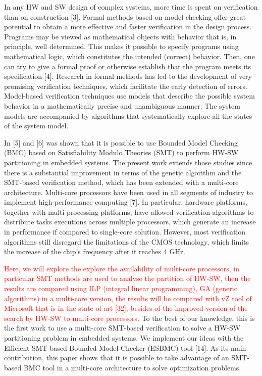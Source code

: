 In any HW and SW design of complex systems, more time is spent on verification than on construction [3]. Formal methods based on model checking offer great potential to obtain a more effective and faster verification in the design process. Programs may be viewed as mathematical objects with behavior that is, in principle, well determined. This makes it possible to specify programs using mathematical logic, which constitutes the intended (correct) behavior. Then, one can try to give a formal proof or otherwise establish that the program meets its specification [4]. Research in formal methods has led to the development of very promising verification techniques, which facilitate the early detection of errors. Model-based verification techniques use models that describe the possible system behavior in a mathematically precise and unambiguous manner. The system models are accompanied by algorithms that systematically explore all the states of the system model.

In [5] and [6] was shown that it is possible to use Bounded Model Checking (BMC) based on Satisfiability Modulo Theories (SMT) to perform HW-SW partitioning in embedded systems. The present work extends those studies since there is a substantial improvement in terms of the genetic algorithm and the SMT-based verification method, which has been extended with a multi-core architecture. Multi-core processors have been used in all segments of industry to implement high-performance computing [7]. In particular, hardware platforms, together with multi-processing platforms, have allowed verification algorithms to distribute tasks executions across multiple processors, which generate an increase in performance if compared to single-core solution. However, most verification algorithms still disregard the limitations of the CMOS technology, which limits the increase of the chip’s frequency after it reaches 4 GHz.

\textcolor{Red}{Here, we will explore the explore the availability of multi-core processors, in particular SMT methods are used to analyse the partition of HW-SW, then the results are compared using ILP (integral linear programming), GA (generic algorithms) in a multi-core version, the results will be compared with vZ tool of Microsoft that is in the state of art [32], besides of the improved version of the search by HW-SW to multi-core processors.} To the best of our knowledge, this is the first work to use a multi-core SMT-based verification to solve a HW-SW partitioning problem in embedded systems. We implement our ideas with the Efficient SMT-based Bounded Model Checker (ESBMC) tool [14]. As its main contribution, this paper shows that it is possible to take advantage of an SMT-based BMC tool in a multi-core architecture to solve optimization problems.

